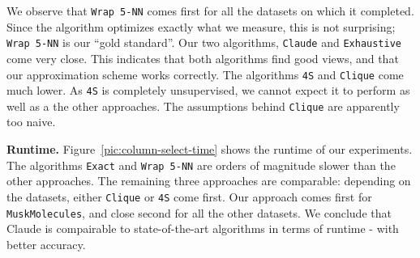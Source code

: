 We observe that \texttt{Wrap 5-NN} comes first for all the datasets on which it
completed. Since the algorithm optimizes exactly what we measure, this is not
surprising; \texttt{Wrap 5-NN} is our ``gold standard''. Our two algorithms,
\texttt{Claude} and \texttt{Exhaustive} come very close. This indicates that
both algorithms find good views, and that our approximation scheme works
correctly.  The algorithms \texttt{4S} and \texttt{Clique} come much lower. As
\texttt{4S} is completely unsupervised, we cannot expect it to perform as well
as a the other approaches. The assumptions behind \texttt{Clique} are
apparently too naive.

\textbf{Runtime.} Figure~\ref{pic:column-select-time} shows the runtime of our
experiments. The algorithms \texttt{Exact} and \texttt{Wrap 5-NN} are orders of
magnitude slower than the other approaches. The remaining three approaches are
comparable: depending on the datasets, either \texttt{Clique} or \texttt{4S}
come first. Our approach comes first for \texttt{MuskMolecules}, and close
second for all the other datasets. We conclude that Claude is compairable to
state-of-the-art algorithms in terms of runtime - with better accuracy.

